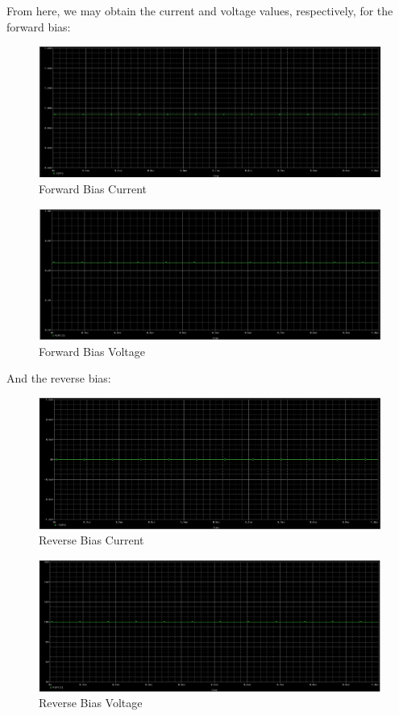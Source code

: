 \documentclass[
	letterpaper, %
	10pt, %
]{CSUniSchoolLabReport}
\begin{document}
  From here, we may obtain the current and voltage values, respectively, for the forward bias:

  \begin{figure}[H]
    \centering
    \includegraphics[width=.9\textwidth]{Figures/L2F5}
    \caption{Forward Bias Current}
    \label{fig:7}
  \end{figure}

  \begin{figure}[H]
    \centering
    \includegraphics[width=.9\textwidth]{Figures/L2F6}
    \caption{Forward Bias Voltage}
    \label{fig:8}
  \end{figure}

  And the reverse bias:

  \begin{figure}[H]
    \centering
    \includegraphics[width=.9\textwidth]{Figures/L2F7}
    \caption{Reverse Bias Current}
    \label{fig:9}
  \end{figure}

  \begin{figure}[H]
    \centering
    \includegraphics[width=.9\textwidth]{Figures/L2F8}
    \caption{Reverse Bias Voltage}
    \label{fig:10}
  \end{figure}
\end{document}
